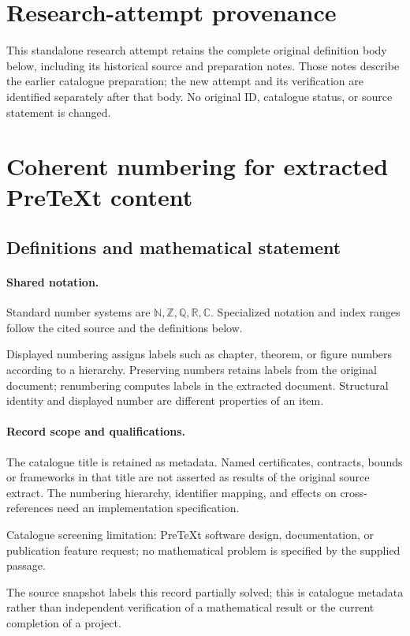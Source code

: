 \documentclass[11pt]{article}
\begin{document}
\section*{Research-attempt provenance}
This standalone research attempt retains the complete original definition body below,
including its historical source and preparation notes. Those notes describe the
earlier catalogue preparation; the new attempt and its verification are identified
separately after that body. No original ID, catalogue status, or source statement is changed.

\section{Coherent numbering for extracted PreTeXt content}\label{statement}

\subsection{Definitions and mathematical statement}

\paragraph{Shared notation.}Standard number systems are $\mathbb N,\mathbb Z,\mathbb Q,\mathbb R,\mathbb C$. Specialized notation and index ranges follow the cited source and the definitions below.


Displayed numbering assigns labels such as chapter, theorem, or figure numbers according to a hierarchy. Preserving numbers retains labels from the original document; renumbering computes labels in the extracted document. Structural identity and displayed number are different properties of an item.
\paragraph{Record scope and qualifications.}
The catalogue title is retained as metadata. Named certificates, contracts, bounds or frameworks in that title are not asserted as results of the original source extract.
The numbering hierarchy, identifier mapping, and effects on cross-references need an implementation specification.

Catalogue screening limitation: PreTeXt software design, documentation, or publication feature request; no mathematical problem is specified by the supplied passage.

The source snapshot labels this record partially solved; this is catalogue metadata rather than independent verification of a mathematical result or the current completion of a project.
\end{document}
